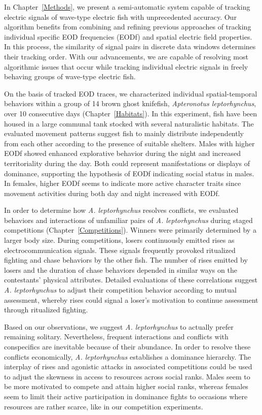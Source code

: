 \documentclass[11pt,pdftex,]{book}
\newcommand{\chapref}[1]{Chapter~\ref{#1}}
\newcommand{\Lepto}{\textit{Apteronotus leptorhynchus}}
\newcommand{\lepto}{\textit{A. leptorhynchus}}
\begin{document}
In \chapref{Methods}, we present a semi-automatic system capable of tracking electric signals of wave-type electric fish with unprecedented accuracy. Our algorithm benefits from combining and refining previous approaches of tracking individual specific EOD frequencies (EODf) and spatial electric field properties. In this process, the similarity of signal pairs in discrete data windows determines their tracking order. With our advancements, we are capable of resolving most algorithmic issues that occur while tracking individual electric signals in freely behaving groups of wave-type electric fish.

On the basis of tracked EOD traces, we characterized individual spatial-temporal behaviors within a group of 14 brown ghost knifefish, \Lepto{}, over 10 consecutive days (\chapref{Habitats}). In this experiment, fish have been housed in a large communal tank stocked with several naturalistic habitats. The evaluated movement patterns suggest fish to mainly distribute independently from each other according to the presence of suitable shelters. Males with higher EODf showed enhanced explorative behavior during the night and increased territoriality during the day. Both could represent manifestations or displays of dominance, supporting the hypothesis of EODf indicating social status in males. In females, higher EODf seems to indicate more active character traits since movement activities during both day and night increased with EODf.

In order to determine how \lepto{} resolves conflicts, we evaluated behaviors and interactions of unfamiliar pairs of \lepto{} during staged competitions (\chapref{Competitions}). Winners were primarily determined by a larger body size. During competitions, losers continuously emitted rises as electrocommunication signals. These signals frequently provoked ritualized fighting and chase behaviors by the other fish. The number of rises emitted by losers and the duration of chase behaviors depended in similar ways on the contestants' physical attributes. Detailed evaluations of these correlations suggest \lepto{} to adjust their competition behavior according to mutual assessment, whereby rises could signal a loser's motivation to continue assessment through ritualized fighting.

Based on our observations, we suggest \lepto{} to actually prefer remaining solitary. Nevertheless, frequent interactions and conflicts with conspecifics are inevitable because of their abundance. In order to resolve these conflicts economically, \lepto{} establishes a dominance hierarchy. The interplay of rises and agonistic attacks in associated competitions could be used to adjust the skewness in access to resources across social ranks. Males seem to be more motivated to compete and attain higher social ranks, whereas females seem to limit their active participation in dominance fights to occasions where resources are rather scarce, like in our competition experiments. 
\end{document}
